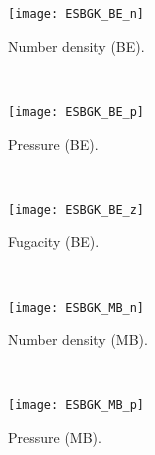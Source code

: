 \documentclass{rsproca}%
\begin{document}
\begin{figure}
        \centering
        \begin{subfigure}[b]{0.32\textwidth}
                \centering
                \texttt{[image: ESBGK\_BE\_n]}
                \caption{Number density (BE).}
                \label{fig:5ESBGK_BE_n}
        \end{subfigure}%
        ~ %
        \begin{subfigure}[b]{0.32\textwidth}
                \centering
                \texttt{[image: ESBGK\_BE\_p]}
                \caption{Pressure (BE).}
                \label{fig:5ESBGK_BE_p}
        \end{subfigure}
        ~ %
        \begin{subfigure}[b]{0.32\textwidth}
                \centering
                \texttt{[image: ESBGK\_BE\_z]}
                \caption{Fugacity (BE).}
                \label{fig:5ESBGK_BE_z}
        \end{subfigure}
				~ %
        \begin{subfigure}[b]{0.32\textwidth}
                \centering
                \texttt{[image: ESBGK\_MB\_n]}
                \caption{Number density (MB).}
                \label{fig:5ESBGK_MB_n}
        \end{subfigure}
        ~ %
        \begin{subfigure}[b]{0.32\textwidth}
                \centering
                \texttt{[image: ESBGK\_MB\_p]}
                \caption{Pressure (MB). }
                \label{fig:5ESBGK_MB_p}
        \end{subfigure}
				~ %
        \begin{subfigure}[b]{0.32\textwidth}

\end{subfigure}
\end{figure}
\end{document}
